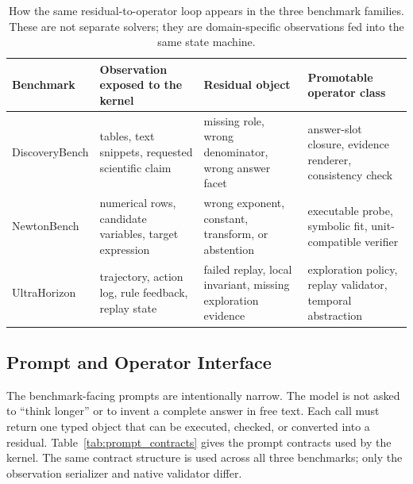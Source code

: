 \documentclass[letterpaper]{article}
\newcommand{\tblhdr}{\rowcolor{headerrow}}
\begin{document}
\begin{table}[H]
\centering
\caption{How the same residual-to-operator loop appears in the three benchmark
families. These are not separate solvers; they are domain-specific observations
fed into the same state machine.}
\label{tab:shared_loop}
\small
\setlength{\tabcolsep}{5pt}
\begin{tabularx}{0.96\textwidth}{@{}lYYY@{}}
\toprule
\tblhdr
Benchmark & Observation exposed to the kernel & Residual object & Promotable operator class \\
\midrule
DiscoveryBench & tables, text snippets, requested scientific claim & missing role, wrong denominator, wrong answer facet & answer-slot closure, evidence renderer, consistency check \\
NewtonBench & numerical rows, candidate variables, target expression & wrong exponent, constant, transform, or abstention & executable probe, symbolic fit, unit-compatible verifier \\
UltraHorizon & trajectory, action log, rule feedback, replay state & failed replay, local invariant, missing exploration evidence & exploration policy, replay validator, temporal abstraction \\
\bottomrule
\end{tabularx}
\end{table}

\subsection*{Prompt and Operator Interface}

The benchmark-facing prompts are intentionally narrow. The model is not asked
to ``think longer'' or to invent a complete answer in free text. Each call must
return one typed object that can be executed, checked, or converted into a
residual. Table~\ref{tab:prompt_contracts} gives the prompt contracts used by
the kernel. The same contract structure is used across all three benchmarks;
only the observation serializer and native validator differ.
\end{document}
